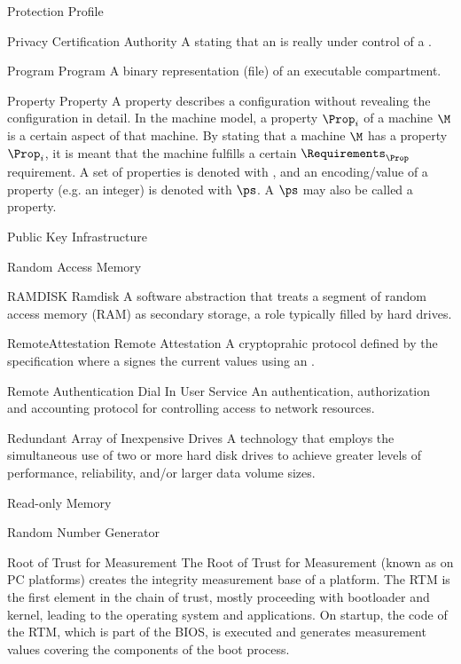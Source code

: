     {Protection Profile}

    {Privacy Certification Authority}
    {A \TTP stating that an \AIK is really under control of a \TPM.}

\glosentry
    {Program}
    {Program}
    {A binary representation (file) of an executable compartment.}

\glosentry
    {Property}
    {Property}
    {A property describes a configuration without revealing the configuration in
detail. In the machine model, a property $\Prop_i$ of a machine $\M$ is a
certain aspect of that machine. By stating that a machine $\M$ has a property
$\Prop_i$, it is meant that the machine fulfills a certain $\Requirements_\Prop$
requirement. A set of properties is denoted with \PropSet, and an encoding/value
of a property (e.g. an integer) is denoted with $\ps$. A $\ps$ may also be
called a property.}

    {Public Key Infrastructure}

    {Random Access Memory}

\glosentry
    {RAMDISK}
    {Ramdisk}
    {A software abstraction that treats a segment of random access memory (RAM)
as secondary storage, a role typically filled by hard drives.}

\glosentry
    {RemoteAttestation}
    {Remote Attestation}
    {A cryptoprahic protocol defined by the \TCG specification where a \TPM signes the
     current \PCR values using an \AIK.}

    {Remote Authentication Dial In User Service}
    {An authentication, authorization and accounting protocol for controlling
access to network resources.}

    {Redundant Array of Inexpensive Drives}
    {A technology that employs the simultaneous use of two or more hard disk drives to achieve greater levels of performance, reliability, and/or larger data volume sizes.}

    {Read-only Memory}

    {Random Number Generator}

    {Root of Trust for Measurement}
    {The Root of Trust for Measurement (known as \CRTM on PC platforms) creates the integrity measurement base of a platform. The RTM is the first element in the chain of trust, mostly proceeding with bootloader and kernel, leading to the operating system and applications. On startup, the code of the RTM, which is part of the BIOS, is executed and generates measurement values covering the components of the boot process.}

